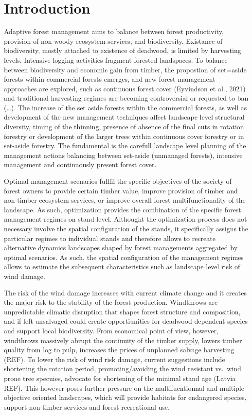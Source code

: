 \documentclass[]{elsarticle} %
\begin{document}
\newpage

\section{Introduction}\label{introduction}

Adaptive forest management aims to balance between forest productivity,
provision of non-woody ecosystem services, and biodiversity. Existance
of biodiversity, mostly attached to existence of deadwood, is limited by
harvesting levels. Intensive logging activities fragment forested
landspaces. To balance between biodiversity and economic gain from
timber, the propostion of set=aside forests within commercial forests
emerges, and new forest management approaches are explored, such as
continuous forest cover (Eyvindson et al., 2021) and traditional
harvesting regimes are becoming controversial or requested to ban
(\ldots{}). The increase of the set aside forests within the commercial
forests, as well as development of the new management techniques affect
landscape level structural diversity, timing of the thinning, presence
of absence of the final cuts in rotation forestry or development of the
larger trees within continuous cover forestry or in set-aside forestry.
The fundamental is the carefull landscape level planning of the
management actions balancing between set-aside (unmanaged forests),
intensive management and continuously present forest cover.

Optimal management scenarios fullfil the specific objectives of the
society of forest owners to provide certain timber value, improve
provision of timber and non-timber ecosystem services, or improve
overall forest multifunctionality of the landscape. As such,
optimization provides the combination of the specific forest management
regimes on stand level. Althought the optimization process does not
necessary involve the spatial configuration of the stands, it
specifically assigns the particular regimes to individual stands and
therefore allows to recreate alternative dynamics landscapes shaped by
forest managements aggregated by optimal scenarios. As such, the spatial
configuration of the management regimes allows to estimate the
subsequent characteristics such as landscape level risk of wind damage.

The risk of the wind damage increases with current climate change and it
creates the major risk to the stability of the forest production.
Windthrows are unpredictable climatic disruption that shapes forest
structure and composition, and if left unsalvaged could create
opportiunities for deadwood dependent species and support local
biodiversity. From economical point of view, however, windthrows
massively abrupt the continuity of the timber supply, lowers timber
quality from log to pulp, increases the prices of unplanned salvage
harvesting (REF). To lower the risk of wind risk damage, current
suggestions include shortening the rotation period, promoting/avoiding
the wind resistant vs.~wind prone tree specuies, advocate for shortening
of the minimal stand age (Latvia REF). This however poses further
pressure on the multifucntionnal and multiple objective oriented
landscapes, which will provide habitats for endangered species, support
non-timber services and forest recreational use.
\end{document}
